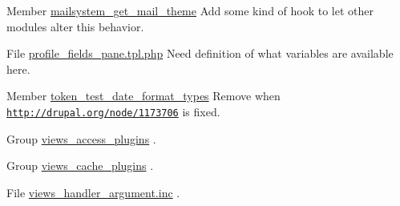 \begin{DoxyDescription}
\item[Member \hyperlink{mailsystem_8module_af55c024d345c05de91cddc64ca83b7f7}{mailsystem\_\-get\_\-mail\_\-theme} ]Add some kind of hook to let other modules alter this behavior. 
\end{DoxyDescription}

\label{todo__todo000016}
\hypertarget{todo__todo000016}{}
 
\begin{DoxyDescription}
\item[File \hyperlink{profile__fields__pane_8tpl_8php}{profile\_\-fields\_\-pane.tpl.php} ]Need definition of what variables are available here. 
\end{DoxyDescription}

\label{todo__todo000043}
\hypertarget{todo__todo000043}{}
 
\begin{DoxyDescription}
\item[Member \hyperlink{token__test_8module_ae5274fe6510bcb89e53bd7e66c7deb43}{token\_\-test\_\-date\_\-format\_\-types} ]Remove when \href{http://drupal.org/node/1173706}{\tt http://drupal.org/node/1173706} is fixed. 
\end{DoxyDescription}

\label{todo__todo000054}
\hypertarget{todo__todo000054}{}
 
\begin{DoxyDescription}
\item[Group \hyperlink{group__views__access__plugins}{views\_\-access\_\-plugins} ].


\end{DoxyDescription}

\label{todo__todo000055}
\hypertarget{todo__todo000055}{}
 
\begin{DoxyDescription}
\item[Group \hyperlink{group__views__cache__plugins}{views\_\-cache\_\-plugins} ].


\end{DoxyDescription}

\label{todo__todo000044}
\hypertarget{todo__todo000044}{}
 
\begin{DoxyDescription}
\item[File \hyperlink{views__handler__argument_8inc}{views\_\-handler\_\-argument.inc} ]. 
\end{DoxyDescription}

